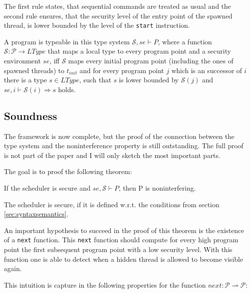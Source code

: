\documentclass[a4paper,10pt]{llncs}
\begin{document}
\begin{prooftree}
\end{prooftree}

The first rule states, that sequential commands are treated as usual
and the second rule ensures, that the security level of the entry point
of the spawned thread, is lower bounded by the level of the \texttt{start}
instruction.

A program is typeable in this type system $\mathcal{S}, se \vdash P$, where a function $\mathcal{S}:
\mathcal{P} \rightarrow LType$ that maps a local type to every program point
and a security environment $se$, iff $\mathcal{S}$ maps every initial program point
(including the ones of spawned threads) to $t_{init}$ and for every program point $j$ which is an
successor of $i$ there is a type $s \in LType$, such that $s$ is lower bounded
by $\mathcal{S}(j)$ and $se, i \vdash \mathcal{S}(i) \Rightarrow s$ holds.


\subsection{Soundness}
\label{sec:soundness}
The framework is now complete, but the proof of the connection between the
type system and the noninterference property is still outstanding. The full
proof is not part of the paper and I will only sketch the most important
parts.

The goal is to proof the following theorem:

\begin{theorem}
If the scheduler is secure and $se, \mathcal{S} \vdash P$, then P is noninterfering.
\end{theorem}

The scheduler is secure, if it is defined w.r.t. the conditions from section \ref{sec:syntaxsemantics}.

An important hypothesis to succeed in the proof of this theorem is the existence
of a \texttt{next} function. This \texttt{next} function should compute for every
high program point the first subsequent program point with a low security level. With
this function one is able to detect when a hidden thread is allowed to become visible
again.

This intuition is capture in the following properties for the function $next: \mathcal{P}
\rightharpoonup \mathcal{P}$:
\end{document}
